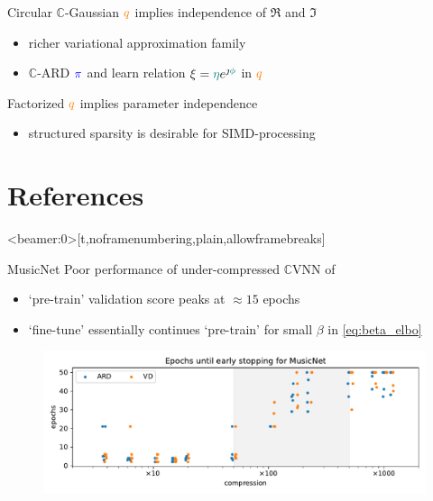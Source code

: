 \documentclass{beamer}
\newcommand{\cplx}{\mathbb{C}}
\newcommand{\iu}{{\jmath}}
\begin{document}
\begin{frame}[c]{\insertsection}

  \medskip
  Circular $\cplx$-Gaussian ${\color{orange} q}$ implies independence of $\Re$ and $\Im$
  \begin{itemize}
    \item richer variational approximation family
    \item $\cplx$-ARD ${\color{blue} \pi}$ and learn relation $
      \xi = {\color{teal} \eta} e^{\iu {\color{teal} \phi}}
    $ in ${\color{orange} q}$
  \end{itemize}

  \medskip
  Factorized ${\color{orange} q}$ implies parameter independence %
  \begin{itemize}
    \item structured sparsity is desirable for SIMD-processing
  \end{itemize}

\end{frame}


\section{References} %
\label{sec:references}

\begin{frame}<beamer:0>[t,noframenumbering,plain,allowframebreaks]{\insertsection}
  \tiny
  
  
\end{frame}


\appendix
\begin{frame}[c]{MusicNet}{\insertsection}
  Poor performance of under-compressed $\cplx$VNN of \cite{trabelsi_deep_2018}
  \begin{itemize}
    \item `pre-train' validation score peaks at $\approx 15$ epochs
    \item `fine-tune' essentially continues `pre-train' for small $\beta$ in \eqref{eq:beta_elbo}
  \end{itemize}

  \begin{figure}[t]
    \centering
    \includegraphics[width=\linewidth]{figure__fine-tune_fx__early__compression.pdf}
  \end{figure}
\end{frame}
\end{document}
